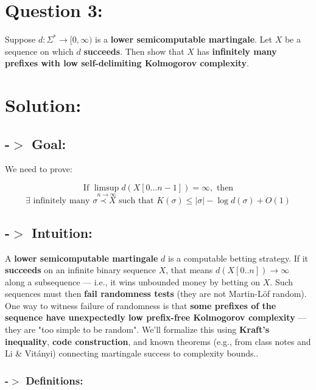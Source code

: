 \documentclass[12pt]{article}
\begin{document}
\newpage
\section*{Question 3:}

Suppose \( d : \Sigma^* \to [0, \infty) \) is a \textbf{lower semicomputable martingale}. Let \( X \) be a sequence on which \(d\) \textbf{succeeds}.  
Then show that \( X \) has \textbf{infinitely many prefixes with low self-delimiting Kolmogorov complexity}.

\section*{Solution:}
\subsection*{-$>$ Goal:}

We need to prove:

\[
\text{If } \limsup_{n \to \infty} d(X[0 \ldots n-1]) = \infty, \text{ then}
\]
\[
\exists \text{ infinitely many } \sigma \prec X \text{ such that } K(\sigma) \leq |\sigma| - \log d(\sigma) + O(1)
\]



\subsection*{-$>$ Intuition:}

A \textbf{lower semicomputable martingale} \( d \) is a computable betting strategy. If it \textbf{succeeds} on an infinite binary sequence \( X \), that means \( d(X[0..n]) \to \infty \) along a subsequence — i.e., it wins unbounded money by betting on \( X \).
\newline
\newline
Such sequences must then \textbf{fail randomness tests} (they are not Martin-Löf random). One way to witness failure of randomness is that \textbf{some prefixes of the sequence have unexpectedly low prefix-free Kolmogorov complexity} — they are "too simple to be random".
\newline
\newline
We’ll formalize this using \textbf{Kraft's inequality}, \textbf{code construction}, and known theorems (e.g., from class notes and Li \& Vitányi) connecting martingale success to complexity bounds..



\subsubsection*{-$>$ Definitions:}
\end{document}
